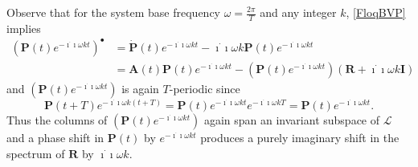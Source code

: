 \documentclass[pdflatex,sn-mathphys-num]{sn-jnl}%
\theoremstyle{thmstyleone}%
\theoremstyle{thmstyletwo}%
\theoremstyle{thmstylethree}%
\begin{document}
Observe that for the system base frequency ${\omega}=\frac{2\pi}{T}$ and any integer $k$, \eqref{FloqBVP} implies 
\begin{align} 
\left(\mathbf{P}(t)e^{-\dot{\imath\!\imath}{\omega}kt}\right)^{\bullet}&=\dot{\mathbf{P}}(t)e^{-\dot{\imath\!\imath}{\omega}kt}-\dot{\imath\!\imath}{\omega}k\mathbf{P}(t)e^{-\dot{\imath\!\imath}{\omega}kt} \nonumber \\
&=\mathbf{A}(t)\mathbf{P}(t)e^{-\dot{\imath\!\imath}{\omega}kt} -\left(\mathbf{P}(t)e^{-\dot{\imath\!\imath}{\omega}kt}\right)\left(\mathbf{R}+\dot{\imath\!\imath}{\omega}k\mathbf{I}\right) \label{FloqBVPtransl}
\end{align}
and $\left(\mathbf{P}(t)e^{-\dot{\imath\!\imath}{\omega}kt}\right)$ is again $T$-periodic since 
$$
\mathbf{P}(t+T)e^{-\dot{\imath\!\imath}{\omega}k(t+T)}=\mathbf{P}(t)e^{-\dot{\imath\!\imath}{\omega}kt}e^{-\dot{\imath\!\imath}{\omega}kT}=\mathbf{P}(t)e^{-\dot{\imath\!\imath}{\omega}kt}.
$$
Thus the columns of $\left(\mathbf{P}(t)e^{-\dot{\imath\!\imath}{\omega}kt}\right)$ again span an invariant subspace of $\mathscr{L}$ and a phase shift in $\mathbf{P}(t)$ by $e^{-\dot{\imath\!\imath}{\omega}kt}$ produces a purely imaginary shift in  the spectrum of $\mathbf{R}$ by $\dot{\imath\!\imath}{\omega}k$.
\end{document}
